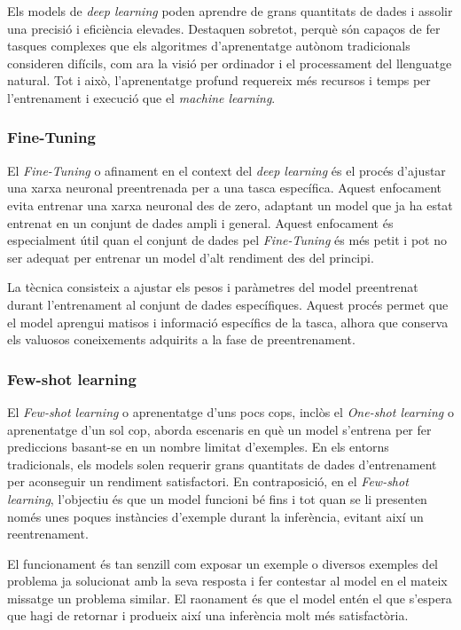 Els models de \textit{deep learning} poden aprendre de grans quantitats de dades i assolir una precisió i eficiència elevades. Destaquen sobretot, perquè són capaços de fer tasques complexes que els algoritmes d'aprenentatge autònom tradicionals consideren difícils, com ara la visió per ordinador i el processament del llenguatge natural. Tot i això, l'aprenentatge profund requereix més recursos i temps per l'entrenament i execució que el \textit{machine learning}.


\subsubsection{Fine-Tuning}
El \textit{Fine-Tuning} o afinament en el context del \textit{deep learning} és el procés d'ajustar una xarxa neuronal preentrenada per a una tasca específica. Aquest enfocament evita entrenar una xarxa neuronal des de zero, adaptant un model que ja ha estat entrenat en un conjunt de dades ampli i general. Aquest enfocament és especialment útil quan el conjunt de dades pel \textit{Fine-Tuning} és més petit i pot no ser adequat per entrenar un model d'alt rendiment des del principi.

La tècnica consisteix a ajustar els pesos i paràmetres del model preentrenat durant l'entrenament al conjunt de dades específiques. Aquest procés permet que el model aprengui matisos i informació específics de la tasca, alhora que conserva els valuosos coneixements adquirits a la fase de preentrenament.


\subsubsection{Few-shot learning}
El \textit{Few-shot learning} o aprenentatge d'uns pocs cops, inclòs el \textit{One-shot learning} o aprenentatge d'un sol cop, aborda escenaris en què un model s'entrena per fer prediccions basant-se en un nombre limitat d'exemples. En els entorns tradicionals, els models solen requerir grans quantitats de dades d'entrenament per aconseguir un rendiment satisfactori. En contraposició, en el \textit{Few-shot learning}, l'objectiu és que un model funcioni bé fins i tot quan se li presenten només unes poques instàncies d'exemple durant la inferència, evitant així un reentrenament.

El funcionament és tan senzill com exposar un exemple o diversos exemples del problema ja solucionat amb la seva resposta i fer contestar al model en el mateix missatge un problema similar. El raonament és que el model entén el que s'espera que hagi de retornar i produeix així una inferència molt més satisfactòria.

